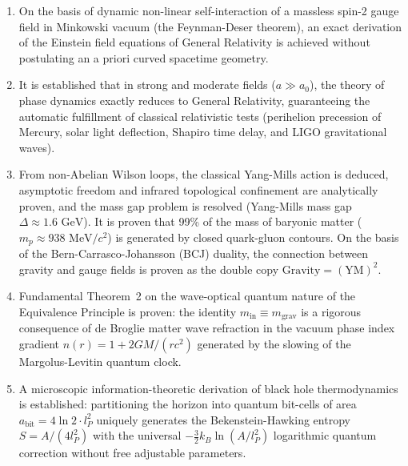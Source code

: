 \begin{enumerate}
\item On the basis of dynamic non-linear self-interaction of a massless spin-2 gauge field in Minkowski vacuum (the Feynman-Deser theorem), an exact derivation of the Einstein field equations of General Relativity is achieved without postulating an a priori curved spacetime geometry.
\item It is established that in strong and moderate fields ($a \gg a_0$), the theory of phase dynamics exactly reduces to General Relativity, guaranteeing the automatic fulfillment of classical relativistic tests (perihelion precession of Mercury, solar light deflection, Shapiro time delay, and LIGO gravitational waves).
\item From non-Abelian Wilson loops, the classical Yang-Mills action is deduced, asymptotic freedom and infrared topological confinement are analytically proven, and the mass gap problem is resolved (Yang-Mills mass gap $\Delta \approx 1.6\text{ GeV}$). It is proven that 99\% of the mass of baryonic matter ($m_p \approx 938\text{ MeV}/c^2$) is generated by closed quark-gluon contours. On the basis of the Bern-Carrasco-Johansson (BCJ) duality, the connection between gravity and gauge fields is proven as the double copy $\text{Gravity} = (\text{YM})^2$.
\item Fundamental Theorem~2 on the wave-optical quantum nature of the Equivalence Principle is proven: the identity $m_{\text{in}} \equiv m_{\text{grav}}$ is a rigorous consequence of de Broglie matter wave refraction in the vacuum phase index gradient $n(r) = 1 + 2GM/(rc^2)$ generated by the slowing of the Margolus-Levitin quantum clock.
\item A microscopic information-theoretic derivation of black hole thermodynamics is established: partitioning the horizon into quantum bit-cells of area $a_{\text{bit}} = 4\ln 2 \cdot l_P^2$ uniquely generates the Bekenstein-Hawking entropy $S = A / (4 l_P^2)$ with the universal $- \frac{3}{2} k_B \ln(A/l_P^2)$ logarithmic quantum correction without free adjustable parameters.
\end{enumerate}


